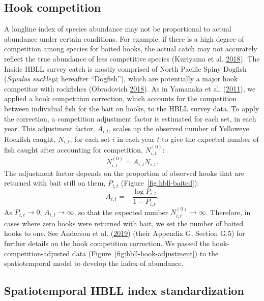 \documentclass[11pt]{book}
\begin{document}
\hypertarget{sec:hbll-hook-competition}{%
\subsection{Hook competition}\label{sec:hbll-hook-competition}}

A longline index of species abundance may not be proportional to actual abundance under certain conditions. For example, if there is a high degree of competition among species for baited hooks, the actual catch may not accurately reflect the true abundance of less competitive species (Kuriyama et al. \protect\hyperlink{ref-kuriyama2018}{2018}). The Inside HBLL survey catch is mostly comprised of North Pacific Spiny Dogfish (\emph{Squalus suckleyi}; hereafter ``Dogfish''), which are potentially a major hook competitor with rockfishes (Obradovich \protect\hyperlink{ref-obradovich2018}{2018}). As in Yamanaka et al. (\protect\hyperlink{ref-yamanaka2011}{2011}), we applied a hook competition correction, which accounts for the competition between individual fish for the bait on hooks, to the HBLL survey data. To apply the correction, a competition adjustment factor is estimated for each set, in each year. This adjustment factor, \(A_{i,t}\), scales up the observed number of Yelloweye Rockfish caught, \(N_{i,t}\), for each set \(i\) in each year \(t\) to give the expected number of fish caught after accounting for competition, \(N_{i,t}^{(0)}\):
\begin{equation}
N_{i,t}^{(0)} = A_{i,t} N_{i,t}.
\label{eq:Nit}
\end{equation}
The adjustment factor depends on the proportion of observed hooks that are returned with bait still on them, \(P_{i,t}\) (Figure~\ref{fig:hbll-baited}):
\begin{equation}
A_{i,t} = - \frac{ \log P_{i,t}}{1 - P_{i,t}}.
\label{eq:hbll-hook-adjustment}
\end{equation}
As \(P_{i,t} \rightarrow 0\), \(A_{i,t} \rightarrow \infty\), so that the expected number \(N_{i,t}^{(0)} \rightarrow \infty\). Therefore, in cases where zero hooks were returned with bait, we set the number of baited hooks to one. See Anderson et al. (\protect\hyperlink{ref-anderson2019synopsis}{2019}) (their Appendix G, Section G.5) for further details on the hook competition correction. We passed the hook-competition-adjusted data (Figure~\ref{fig:hbll-hook-adjustment}) to the spatiotemporal model to develop the index of abundance.

\hypertarget{sec:hbll-spatiotemporal}{%
\subsection{Spatiotemporal HBLL index standardization}\label{sec:hbll-spatiotemporal}}
\end{document}
